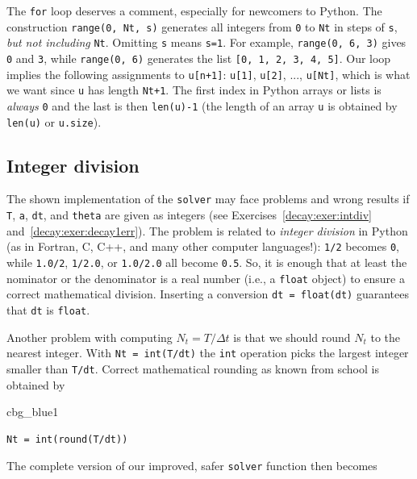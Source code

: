 \documentclass[%
oneside,                 %
final,                   %
10pt]{article}
\newenvironment{_cod_tight}[1]{
   \def\FrameCommand{\colorbox{#1}}
   \FrameRule0.6pt\MakeFramed {\FrameRestore}\vskip3mm}
   {\vskip0mm\endMakeFramed}
\newenvironment{cod}[1]{
\bgroup\rmfamily
\fboxsep=0mm\relax
\begin{_cod_tight}{#1}
\list{}{\parsep=-2mm\parskip=0mm\topsep=0pt\leftmargin=2mm
\rightmargin=2\leftmargin\leftmargin=4pt\relax}
\item\relax}
{\endlist\end{_cod_tight}\egroup}
\begin{document}
\noindent
The \texttt{for} loop deserves a comment, especially for newcomers to Python.
The construction \texttt{range(0, Nt, s)} generates all integers from \texttt{0} to \texttt{Nt}
in steps of \texttt{s}, \emph{but not including} \texttt{Nt}. Omitting \texttt{s} means \texttt{s=1}.
For example, \texttt{range(0, 6, 3)}
gives \texttt{0} and \texttt{3}, while \texttt{range(0, 6)} generates
the list \texttt{[0, 1, 2, 3, 4, 5]}.
Our loop implies the following assignments to \texttt{u[n+1]}: \texttt{u[1]}, \texttt{u[2]}, ...,
\texttt{u[Nt]}, which is what we want since \texttt{u} has length \texttt{Nt+1}.
The first index in Python arrays or lists is \emph{always} \texttt{0} and the
last is then \texttt{len(u)-1} (the length of an array \texttt{u} is obtained by
\texttt{len(u)} or \texttt{u.size}).

\subsection{Integer division}
\label{decay:py2}

The shown implementation of the \texttt{solver} may face problems and
wrong results if \texttt{T}, \texttt{a}, \texttt{dt}, and \texttt{theta} are given as integers
(see Exercises~\ref{decay:exer:intdiv} and~\ref{decay:exer:decay1err}).
The problem is related to \emph{integer division} in Python (as
in Fortran, C, C++, and many other computer languages!): \texttt{1/2} becomes \texttt{0},
while \texttt{1.0/2}, \texttt{1/2.0}, or \texttt{1.0/2.0} all become \texttt{0.5}. So, it is enough
that at least the nominator or the denominator is a real number
(i.e., a \texttt{float} object)
to ensure a correct mathematical division. Inserting
a conversion \texttt{dt = float(dt)}
guarantees that \texttt{dt} is
\texttt{float}.

Another problem with computing $N_t=T/\Delta t$ is that we should
round $N_t$ to the nearest integer. With \texttt{Nt = int(T/dt)} the \texttt{int}
operation picks the largest integer smaller than \texttt{T/dt}. Correct
mathematical rounding as known from school is obtained by
\begin{cod}{cbg_blue1}\begin{Verbatim}[numbers=none,fontsize=\fontsize{9pt}{9pt},baselinestretch=0.95,xleftmargin=2mm]
Nt = int(round(T/dt))
\end{Verbatim}
\end{cod}
\noindent
The complete version of our improved, safer \texttt{solver} function then becomes
\end{document}

